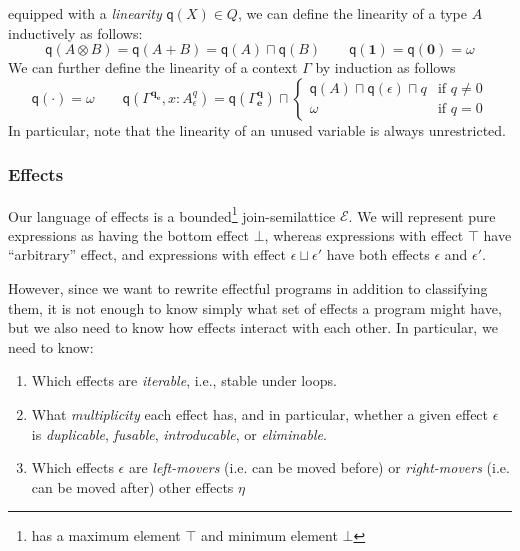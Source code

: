 \documentclass[acmsmall,screen,review]{acmart}
\newcommand{\mc}[1]{\ensuremath{\mathcal{#1}}}
\newcommand{\mb}[1]{\ensuremath{\mathbf{#1}}}
\newcommand{\ms}[1]{\ensuremath{\mathsf{#1}}}
\newcommand{\topq}{\omega}
\newcommand{\alquant}{\ms{q}}
\begin{document}
equipped with a \emph{linearity} $\alquant(X) \in Q$, we can define the linearity of a type $A$
inductively as follows:
\begin{equation}
  \alquant(A \otimes B) = \alquant(A + B) = \alquant(A) \sqcap \alquant(B) \qquad
  \alquant(\mb{1}) = \alquant(\mb{0}) = \topq
\end{equation}
We can further define the linearity of a context $\Gamma$ by induction as follows
\begin{equation}
  \alquant(\cdot) = \topq \qquad
  \alquant(\Gamma^{\mb{q}_{\mb{e}}}, x : A^q_\epsilon) 
    = \alquant(\Gamma^{\mb{q}}_{\mb{e}}) \sqcap \begin{cases}
    \alquant(A) \sqcap \alquant(\epsilon) \sqcap q & \text{if } q \neq 0 \\
    \topq & \text{if } q = 0
  \end{cases}
\end{equation}
In particular, note that the linearity of an unused variable is always unrestricted.
%

\subsubsection{Effects}
Our language of effects is a bounded\footnote{has a maximum element $\top$ and minimum element $\bot$} join-semilattice $\mc{E}$. We will represent pure expressions
as having the bottom effect $\bot$, whereas expressions with effect $\top$ have ``arbitrary''
effect, and expressions with effect $\epsilon \sqcup \epsilon'$
have both effects $\epsilon$ and $\epsilon'$.



However, since we want to rewrite effectful programs in addition to classifying them, it is not enough to know simply what set of effects a program might have, but we also need to know how effects interact with each
other. In particular, we need to know:
\begin{enumerate}
  \item Which effects are \emph{iterable}, i.e., stable under loops. %
  \item What \emph{multiplicity} each effect has, and in particular, whether a given effect
  $\epsilon$ is \emph{duplicable}, \emph{fusable}, \emph{introducable}, or \emph{eliminable}.
  \item Which effects $\epsilon$ are \emph{left-movers} (i.e. can be moved before) or
  \emph{right-movers} (i.e. can be moved after) other effects $\eta$
\end{enumerate}
\end{document}

